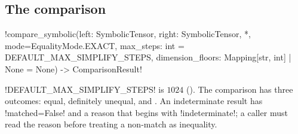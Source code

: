 \subsection{The comparison}

\begin{signature}
\py!compare_symbolic(left: SymbolicTensor, right: SymbolicTensor, *, mode=EqualityMode.EXACT, max_steps: int = DEFAULT_MAX_SIMPLIFY_STEPS, dimension_floors: Mapping[str, int] | None = None) -> ComparisonResult!
\end{signature}

\py!DEFAULT_MAX_SIMPLIFY_STEPS! is $1024$ (). The comparison has three outcomes: equal, definitely unequal, and . An indeterminate result has \py!matched=False! and a reason that begins with \code!indeterminate!; a caller must read the reason before treating a non-match as inequality.

